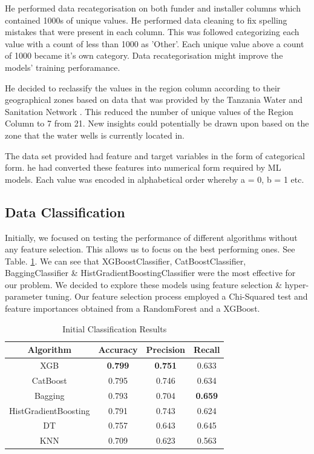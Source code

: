 \documentclass[conference]{IEEEtran}
\begin{document}
He performed data recategorisation on both funder and installer columns which contained 1000s of unique values. He performed data cleaning to fix spelling mistakes that were present in each column. This was followed categorizing each value with a count of less than 1000 as 'Other'. Each unique value above a count of 1000 became it's own category. Data recategorisation might improve the models' training perforamance.

He decided to reclassify the values in the region column according to their geographical zones based on data that was provided by the Tanzania Water and Sanitation Network \cite{tawasanet}. This reduced the number of unique values of the Region Column to 7 from 21. New insights could potentially be drawn upon based on the zone that the water wells is currently located in.

The data set provided had feature and target variables in the form of categorical form. he had converted these features into numerical form required by ML models. Each value was encoded in alphabetical order whereby a = 0, b = 1 etc. 

\subsection{Data Classification}

Initially, we focused on testing the performance of different algorithms without any feature selection. This allows us to focus on the best performing ones. See Table. \ref{tab:initial-clf-results}. We can see that XGBoostClassifier, CatBoostClassifier, BaggingClassifier \& HistGradientBoostingClassifier were the most effective for our problem. We decided to explore these models using feature selection \& hyper-parameter tuning. Our feature selection process employed a Chi-Squared test and feature importances obtained from a RandomForest and a XGBoost.

\begin{table}[h]
  \centering
  \caption{Initial Classification Results}
  \label{tab:initial-clf-results}
  \begin{tabular}{|c|c|c|c|}
    \hline
    \textbf{Algorithm} & \textbf{Accuracy} & \textbf{Precision} & \textbf{Recall} \\ \hline
    XGB	& \textbf{0.799} & \textbf{0.751} & 0.633 \\
    \hline
    CatBoost & 0.795 & 0.746 & 0.634 \\
    \hline
    Bagging & 0.793 & 0.704 & \textbf{0.659} \\
    \hline
    HistGradientBoosting & 0.791 & 0.743 & 0.624 \\
    \hline
    DT & 0.757 & 0.643 & 0.645 \\
    \hline
    KNN & 0.709 & 0.623 & 0.563 \\
    \hline
  \end{tabular}
\end{table}
\end{document}
